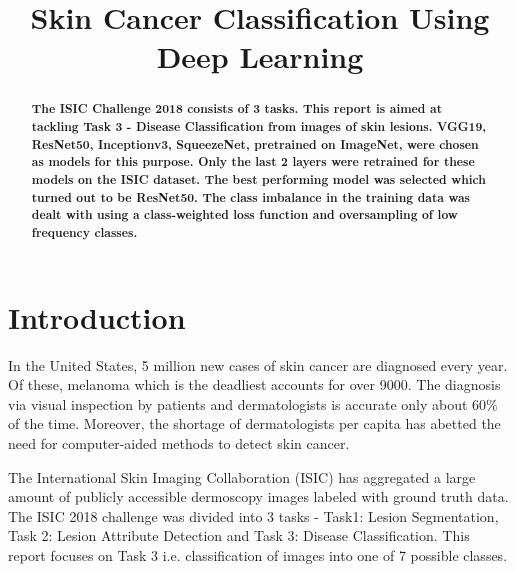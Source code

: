 \documentclass[conference]{IEEEtran}
\begin{document}
\title{Skin Cancer Classification Using Deep Learning\\}
\author{
\and
{}
}

\maketitle

\begin{abstract}
\textbf{The ISIC Challenge 2018 consists of 3 tasks. This report is aimed at tackling Task 3 - Disease Classification from images of skin lesions. VGG19, ResNet50, Inceptionv3, SqueezeNet, pretrained on ImageNet, were chosen as models for this purpose. Only the last 2 layers were retrained for these models on the ISIC dataset. The best performing model was selected which turned out to be ResNet50. The class imbalance in the training data was dealt with using a class-weighted loss function and oversampling of low frequency classes.}
\end{abstract}

\section{Introduction}\label{introduction}

In the United States, 5 million new cases of skin cancer are diagnosed
every year.\cite{rogers2015incidence} Of these, melanoma which is the deadliest accounts
for over 9000.\cite{siegel2017cancer} The diagnosis via visual inspection by patients
and dermatologists is accurate only about 60\% of the time.\cite{kittler2002diagnostic}
Moreover, the shortage of dermatologists per capita has abetted the need
for computer-aided methods to detect skin cancer.\cite{kimball2008us}

The International Skin Imaging Collaboration (ISIC) has aggregated a
large amount of publicly accessible dermoscopy images labeled with
ground truth data. The ISIC 2018 challenge \cite{codella2018skin} was divided into 3
tasks - Task1: Lesion Segmentation, Task 2: Lesion Attribute Detection
and Task 3: Disease Classification. This report focuses on Task 3 i.e.
classification of images into one of 7 possible classes.
\end{document}
